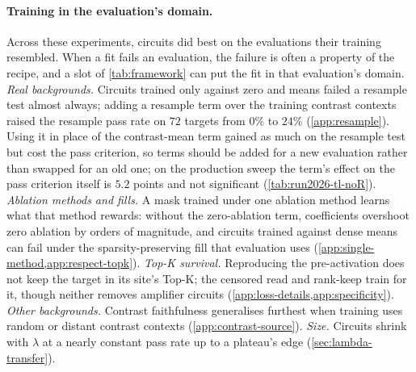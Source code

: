 \paragraph{Training in the evaluation's domain.}
Across these experiments, circuits did best on the evaluations their training resembled.
When a fit fails an evaluation, the failure is often a property of the recipe, and a slot of \cref{tab:framework} can put the fit in that evaluation's domain.
\emph{Real backgrounds.} Circuits trained only against zero and means failed a resample test almost always; adding a resample term over the training contrast contexts raised the resample pass rate on $72$ targets from $0\%$ to $24\%$ (\cref{app:resample}).
Using it in place of the contrast-mean term gained as much on the resample test but cost the pass criterion, so terms should be added for a new evaluation rather than swapped for an old one; on the production sweep the term's effect on the pass criterion itself is $5.2$ points and not significant (\cref{tab:run2026-tl-noR}).
\emph{Ablation methods and fills.} A mask trained under one ablation method learns what that method rewards: without the zero-ablation term, coefficients overshoot zero ablation by orders of magnitude, and circuits trained against dense means can fail under the sparsity-preserving fill that evaluation uses (\cref{app:single-method,app:respect-topk}).
\emph{Top-K survival.} Reproducing the pre-activation does not keep the target in its site's Top-K; the censored read and rank-keep train for it, though neither removes amplifier circuits (\cref{app:loss-details,app:specificity}).
\emph{Other backgrounds.} Contrast faithfulness generalises furthest when training uses random or distant contrast contexts (\cref{app:contrast-source}).
\emph{Size.} Circuits shrink with $\lambda$ at a nearly constant pass rate up to a plateau's edge (\cref{sec:lambda-transfer}).
